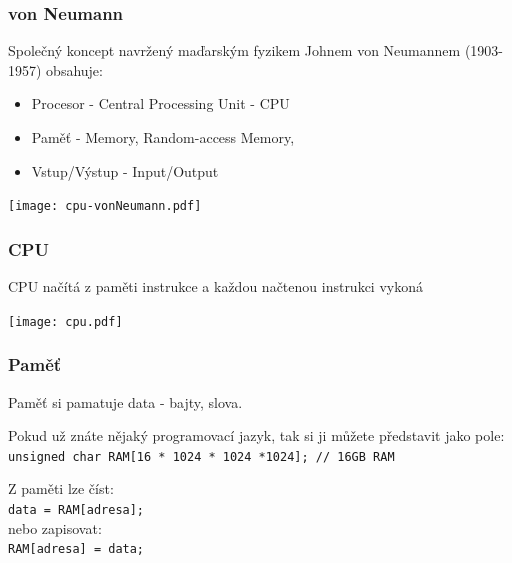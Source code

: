 \documentclass{beamer}
\begin{document}
\begin{frame}
\frametitle{von Neumann}

Společný koncept navržený maďarským fyzikem Johnem von Neumannem (1903-1957) obsahuje:
\begin{itemize}
\item Procesor - Central Processing Unit - CPU
\item Paměť - Memory, Random-access Memory, 
\item Vstup/Výstup - Input/Output
\end{itemize}
\begin{center}
   \texttt{[image: cpu-vonNeumann.pdf]}
\end{center}

\end{frame}


\begin{frame}
\frametitle{CPU}

CPU načítá z paměti instrukce a každou načtenou instrukci vykoná
\begin{center}
   \texttt{[image: cpu.pdf]}
\end{center}

\end{frame}

\begin{frame}
\frametitle{Paměť}

Paměť si pamatuje data - bajty, slova.

Pokud už znáte nějaký programovací jazyk, tak si ji můžete představit jako pole:\\
\texttt{unsigned char RAM[16 * 1024 * 1024 *1024]; // 16GB RAM}

\bigskip
Z paměti lze číst:\\
\texttt{data = RAM[adresa];}\\
nebo zapisovat:\\
\texttt{RAM[adresa] = data;}

\end{frame}
\end{document}
